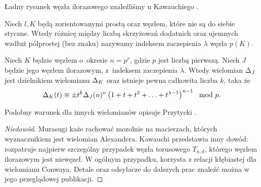 Ładny rysunek węzła ilorazowego znaleźliśmy u Kawauchiego \cite[s. 122]{kawauchi1996}.

\begin{definition}
    Niech $l, K$ będą zorientowanymi prostą oraz węzłem, które nie są do siebie styczne.
    Wtedy różnicę między liczbą skrzyżowań dodatnich oraz ujemnych wzdłuż półprostej (bez znaku) nazywamy indeksem zaczepienia $\lambda$ węzła $p(K)$.
\end{definition}

\begin{proposition}
%
\label{prp:murasugi_periodic}%
    Niech $K$ będzie węzłem o~okresie $n = p^r$, gdzie $p$ jest liczbą pierwszą.
    Niech $J$ będzie jego węzłem ilorazowym, z~indeksem zaczepienia $\lambda$.
    Wtedy wielomian $\Delta_J$ jest dzielnikiem wielomianu $\Delta_K$ oraz istnieje pewna całkowita liczba $k$, taka że
    \begin{equation}
        \Delta_K(t) \equiv \pm t^k \Delta_J(n)^n \left(1 + t + t^2 + \ldots + t^{\lambda - 1}\right)^{n-1} \mod p.
    \end{equation}
\end{proposition}

Podobny warunek dla innych wielomianów opisuje Przytycki \cite[s. 168]{przytycki1995}.

\begin{proof}[Niedowód]
    Murasugi \cite{murasugi1971} każe rachować mozolnie na macierzach, których wyznacznikiem jest wielomian Alexandera.
    Kawauchi \cite[s. 122-124]{kawauchi1996} przedstawia inny dowód: rozpatruje najpierw szczególny przypadek węzła torusowego $T_{n, d}$, którego węzłem ilorazowym jest niewęzeł.
    W ogólnym przypadku, korzysta z relacji kłębiastej dla wielomianu Conwaya.
    Detale oraz odsyłacze do dalszych prac znaleźć można w jego przeglądowej publikacji.
\end{proof}


